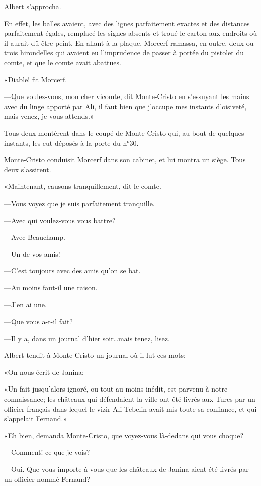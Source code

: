 Albert s'approcha. 

En effet, les balles avaient, avec des lignes parfaitement exactes et des distances parfaitement égales, remplacé les signes absents et troué le carton aux endroits où il aurait dû être peint. En allant à la plaque, Morcerf ramassa, en outre, deux ou trois hirondelles qui avaient eu l'imprudence de passer à portée du pistolet du comte, et que le comte avait abattues. 

«Diable! fit Morcerf. 

—Que voulez-vous, mon cher vicomte, dit Monte-Cristo en s'essuyant les mains avec du linge apporté par Ali, il faut bien que j'occupe mes instants d'oisiveté, mais venez, je vous attends.» 

Tous deux montèrent dans le coupé de Monte-Cristo qui, au bout de quelques instants, les eut déposés à la porte du n°30. 

Monte-Cristo conduisit Morcerf dans son cabinet, et lui montra un siège. Tous deux s'assirent. 

«Maintenant, causons tranquillement, dit le comte. 

—Vous voyez que je suis parfaitement tranquille. 

—Avec qui voulez-vous vous battre? 

—Avec Beauchamp. 

—Un de vos amis! 

—C'est toujours avec des amis qu'on se bat. 

—Au moins faut-il une raison. 

—J'en ai une. 

—Que vous a-t-il fait? 

—Il y a, dans un journal d'hier soir\dots mais tenez, lisez. 

Albert tendit à Monte-Cristo un journal où il lut ces mots: 

«On nous écrit de Janina: 

«Un fait jusqu'alors ignoré, ou tout au moins inédit, est parvenu à notre connaissance; les châteaux qui défendaient la ville ont été livrés aux Turcs par un officier français dans lequel le vizir Ali-Tebelin avait mis toute sa confiance, et qui s'appelait Fernand.» 

«Eh bien, demanda Monte-Cristo, que voyez-vous là-dedans qui vous choque? 

—Comment! ce que je vois? 

—Oui. Que vous importe à vous que les châteaux de Janina aient été livrés par un officier nommé Fernand? 

